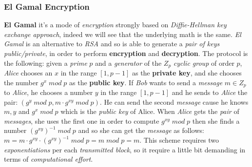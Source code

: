\documentclass{article}
\begin{document}
\subsubsection{El Gamal Encryption}
\textbf{El Gamal} it's a mode of \emph{encryption} strongly based on \emph{Diffie-Hellman key exchange approach}, indeed we will see that the underlying math is the same.\emph{ El Gamal }is an alternative to \emph{RSA} and so is able to generate a \emph{pair of keys public/private}, in order to perform \textbf{encryption} and \textbf{decryption}. The protocol is the following: given a \emph{prime} $p$ and a \emph{generator} of the $Z_p$ \emph{cyclic group} of order $p$, \emph{Alice} chooses an $x$ in the range $\left [1,p-1 \right]$ as the \textbf{private key}, and she chooses the number $g^x \; mod\; p$ as the \textbf{public key}. If \emph{Bob} wants to send a \emph{message} $m \in Z_p$ to \emph{Alice}, he chooses a number $y$ in the range $\left [1,p-1 \right]$ and he sends to \emph{Alice} the pair: $(g^y \; mod\; p, m\cdot g^{xy} \; mod\; p)$. He can send the second \emph{message} cause he knows $m,y$ and $g^x \; mod\; p$ which is the \emph{public key} of Alice. When \emph{Alice} gets the \emph{pair} of \emph{messages}, she uses the first one in order to compute $g^{xy} \; mod\;  p$ then she finds a number $(g^{xy})^{-1} \; mod\; p$ and so she can get the \emph{message} as follows: $m = m \cdot g^{xy} \cdot (g^{xy})^{-1} \; mod\; p = m \; mod\; p = m$. This scheme requires two \emph{exponentiations} per each \emph{transmitted block}, so it require a little bit demanding in terms of \emph{computational effort}. 
\end{document}
